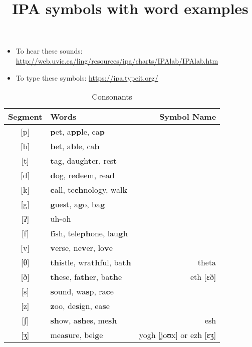\documentclass{article}
\title{IPA symbols with word examples}
\date{}
\begin{document}
  \maketitle

  \begin{itemize}
    \item To hear these sounds: \url{http://web.uvic.ca/ling/resources/ipa/charts/IPAlab/IPAlab.htm}
    \item To type these symbols: \url{https://ipa.typeit.org/}
  \end{itemize}

  \begin{table}[htb]
    \caption{Consonants}
    \centering
    \vspace{0.5cm}
    \begin{tabular}{c | l r}
      Segment & Words & Symbol Name \\
      \hline
      {[}p{]} & \textbf{p}et, a\textbf{pp}le, ca\textbf{p}          & \\
      {[}b{]}  & \textbf{b}et, a\textbf{b}le, ca\textbf{b}          & \\
      {[}t{]}  & \textbf{t}ag, daugh\textbf{t}er, res\textbf{t}     & \\
      {[}d{]}  & \textbf{d}og, re\textbf{d}eem, rea\textbf{d}       & \\
      {[}k{]}  & \textbf{c}all, te\textbf{ch}nology, wal\textbf{k}  & \\
      {[}g{]}  & \textbf{g}uest, a\textbf{g}o, ba\textbf{g}         & \\
      {[}ʔ{]}  & uh\textbf{-}oh                                     & \\
      {[}f{]}  & \textbf{f}ish, tele\textbf{ph}one, lau\textbf{gh}  & \\
      {[}v{]}  & \textbf{v}erse, ne\textbf{v}er, lo\textbf{v}e      & \\
      {[}θ{]}  & \textbf{th}istle, wra\textbf{th}ful, ba\textbf{th} & theta\\
      {[}ð{]}  & \textbf{th}ese, fa\textbf{th}er, ba\textbf{th}e    & eth {[}ɛð{]}\\
      {[}s{]}  & \textbf{s}ound, wa\textbf{s}p, ra\textbf{c}e       & \\
      {[}z{]}  & \textbf{z}oo, de\textbf{s}ign, ea\textbf{s}e       & \\
      {[}ʃ{]}  & \textbf{sh}ow, a\textbf{sh}es, me\textbf{sh}       & esh \\
      {[}ʒ{]}  & mea\textbf{s}ure, bei\textbf{g}e                   & yogh {[}joʊx{]} or ezh {[}ɛʒ{]}\\

\end{tabular}
\end{table}
\end{document}
